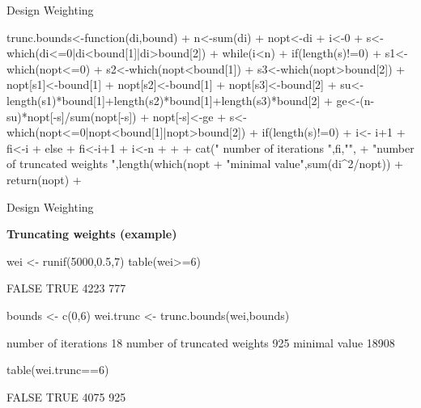 \documentclass[11pt,german,hideothersubsections]{beamer}
\begin{document}
\begin{frame}[fragile]{Design Weighting}
\tiny{
\begin{Schunk}
\begin{Sinput}
 trunc.bounds<-function(di,bound){
+   n<-sum(di)
+   nopt<-di
+   i<-0
+   s<-which(di<=0|di<bound[1]|di>bound[2])
+   while(i<n){
+       if(length(s)!=0){
+       s1<-which(nopt<=0)
+       s2<-which(nopt<bound[1])
+       s3<-which(nopt>bound[2])
+       nopt[s1]<-bound[1]
+       nopt[s2]<-bound[1]
+       nopt[s3]<-bound[2]
+       su<-length(s1)*bound[1]+length(s2)*bound[1]+length(s3)*bound[2]
+       ge<-(n-su)*nopt[-s]/sum(nopt[-s])
+       nopt[-s]<-ge
+       s<-which(nopt<=0|nopt<bound[1]|nopt>bound[2])}
+       if(length(s)!=0){
+       i<- i+1
+       fi<-i}
+       else {
+         fi<-i+1
+         i<-n
+       }
+     }
+   cat(" number of iterations ",fi,"\n",
+       "number of truncated weights ",length(which(nopt%
+   "minimal value",sum(di^2/nopt))
+   return(nopt)
+ }
\end{Sinput}
\end{Schunk}
}
\end{frame}
\begin{frame}[fragile]{Design Weighting}
\footnotesize{
\begin{center}
\textbf{Truncating weights (example) }
\end{center}

\begin{Schunk}
\begin{Sinput}
 wei <- runif(5000,0.5,7)
 table(wei>=6)
\end{Sinput}
\begin{Soutput}
FALSE  TRUE 
 4223   777 
\end{Soutput}
\begin{Sinput}
 bounds <- c(0,6)
 wei.trunc <- trunc.bounds(wei,bounds)
\end{Sinput}
\begin{Soutput}
 number of iterations  18 
 number of truncated weights  925 
 minimal value 18908
\end{Soutput}
\begin{Sinput}
 table(wei.trunc==6)
\end{Sinput}
\begin{Soutput}
FALSE  TRUE 
 4075   925 
\end{Soutput}
\end{Schunk}
}
\end{frame}
\end{document}
